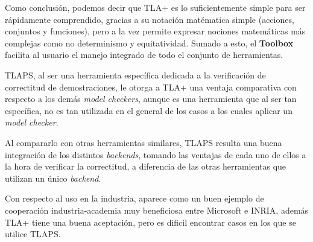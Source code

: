\documentclass[spanish]{llncs}
\begin{document}
Como conclusión, podemos decir que TLA+ es lo suficientemente simple para ser rápidamente comprendido, gracias a su notación matématica simple (acciones, conjuntos y funciones), 
pero a la vez permite expresar nociones matemáticas más complejas como no determinismo y equitatividad. Sumado a esto, el \textbf{Toolbox} facilita al usuario el manejo integrado de todo el conjunto de herramientas. 

TLAPS, al ser una herramienta específica dedicada a la verificación de correctitud de demostraciones, le otorga a TLA+ una ventaja comparativa con respecto a los demás \textit{model checkers}, aunque es una herramienta que al ser tan específica, no es tan utilizada en el general de los casos a los cuales aplicar un \textit{model checker}.

Al compararlo con otras herramientas similares, TLAPS resulta una buena integración de los distintos \textit{backends}, tomando las ventajas de cada uno de ellos a la hora de verificar la correctitud, a diferencia de las otras herramientas que utilizan un único \textit{backend}.

Con respecto al uso en la industria, aparece como un buen ejemplo de cooperación industria-academia muy beneficiosa entre Microsoft e INRIA, además TLA+ tiene una buena aceptación, pero es dificil encontrar casos en los que se utilice TLAPS.
\end{document}
